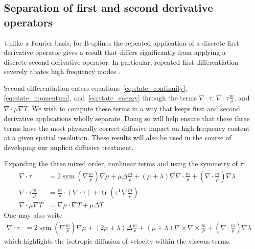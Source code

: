 \documentclass[letterpaper,11pt,nointlimits,reqno,draft]{amsart}
\newcommand{\trans}[1]{{#1}^{\ensuremath{\mathsf{T}}}}
\newcommand{\symmetricpart}[1]
  {\ensuremath{\operatorname{sym}\left(#1\right)}}
\DeclareMathOperator{\trace}{tr}
\begin{document}
\subsection{Separation of first and second derivative operators}
\label{sec:separate_first_second_deriv}

Unlike a Fourier basis, for B-splines the repeated application of a discrete
first derivative operator gives a result that differs significantly from
applying a discrete second derivative operator.  In particular, repeated first
differentiation severely abates high frequency modes
\citep[see][figures~2--3]{Kwok2001}.

Second differentiation enters equations~\eqref{eq:state_continuity},
\eqref{eq:state_momentum}, and~\eqref{eq:state_energy} through the terms
$\nabla\cdot\tau$, $\nabla\cdot\tau\frac{m}{\rho}$, and
$\nabla\cdot\mu\nabla{}T$.  We wish to compute these terms in a way that keeps
first and second derivative applications wholly separate.  Doing so will help
ensure that these three terms have the most physically correct diffusive impact
on high frequency content at a given spatial resolution.  These results will
also be used in the course of developing our implicit diffusive treatment.

Expanding the three mixed order, nonlinear terms and using the symmetry of
$\tau$:
\begin{align}
\label{eq:nabla_cdot_tau_expansion}
  \nabla\cdot\tau
  &=
    2 \symmetricpart{\nabla\frac{m}{\rho}}\nabla\mu
  + \mu \Delta\frac{m}{\rho}
  + \left(\mu+\lambda\right)\nabla\nabla\cdot\frac{m}{\rho}
  + \left(\nabla\cdot\frac{m}{\rho}\right)\nabla\lambda
\\
\label{eq:nabla_cdot_tau_u_expansion}
  \nabla\cdot\tau{}\frac{m}{\rho}
  &=
    \frac{m}{\rho}\cdot\left(\nabla\cdot\tau\right)
  + \trace\left( \trans{\tau}\nabla\frac{m}{\rho} \right)
\\
  \nabla\cdot\mu\nabla{}T \label{eq:mu_delta_T}
  &=
    \nabla\mu\cdot\nabla{}T
  + \mu \Delta{}T
\end{align}
One may also write
\begin{align}\label{eq:nabla_cdot_tau_expansion_alt}
  \nabla\cdot\tau
  &=
    2 \symmetricpart{\nabla\frac{m}{\rho}}\nabla\mu
  + \left(2\mu+\lambda\right) \Delta\frac{m}{\rho}
  + \left(\mu+\lambda\right)\nabla\times\nabla\times\frac{m}{\rho}
  + \left(\nabla\cdot\frac{m}{\rho}\right)\nabla\lambda
\end{align}
which highlights the isotropic diffusion of velocity within the viscous terms.
\end{document}
